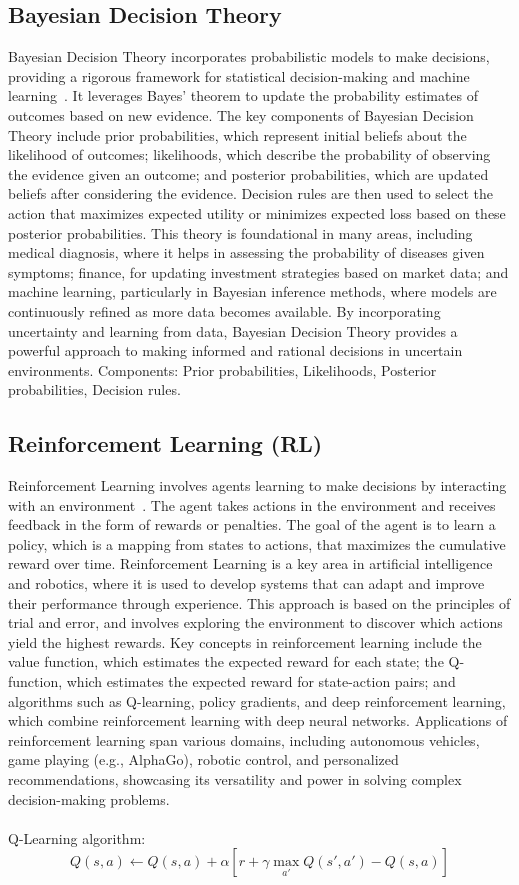 \documentclass[12pt]{article}
\begin{document}
\subsection{Bayesian Decision Theory}
Bayesian Decision Theory incorporates probabilistic models to make decisions, providing a rigorous
framework for statistical decision-making and machine learning~\cite{berger1985statistical}. It leverages Bayes'
theorem to update the probability estimates of outcomes based on new evidence.
The key components of Bayesian Decision Theory include prior probabilities, which
represent initial beliefs about the likelihood of outcomes; likelihoods, which describe
the probability of observing the evidence given an outcome; and posterior probabilities,
which are updated beliefs after considering the evidence. Decision rules are then used
to select the action that maximizes expected utility or minimizes expected loss based
on these posterior probabilities. This theory is foundational in many areas, including
medical diagnosis, where it helps in assessing the probability of diseases given
symptoms; finance, for updating investment strategies based on market data; and machine 
learning, particularly in Bayesian inference methods, where models are continuously
refined as more data becomes available. By incorporating uncertainty and learning from
data, Bayesian Decision Theory provides a powerful approach to making informed and
rational decisions in uncertain environments. Components: Prior probabilities, Likelihoods,
Posterior probabilities, Decision rules.

\subsection{Reinforcement Learning (RL)}
Reinforcement Learning involves agents learning to make decisions by interacting with an
environment~\cite{sutton2018reinforcement}. The agent takes actions in the environment and receives feedback in the
form of rewards or penalties. The goal of the agent is to learn a policy, which is a
mapping from states to actions, that maximizes the cumulative reward over time.
Reinforcement Learning is a key area in artificial intelligence and robotics, where it
is used to develop systems that can adapt and improve their performance through
experience. This approach is based on the principles of trial and error, and involves
exploring the environment to discover which actions yield the highest rewards.
Key concepts in reinforcement learning include the value function, which estimates
the expected reward for each state; the Q-function, which estimates the expected
reward for state-action pairs; and algorithms such as Q-learning, policy gradients,
and deep reinforcement learning, which combine reinforcement learning with deep neural
networks. Applications of reinforcement learning span various domains, including
autonomous vehicles, game playing (e.g., AlphaGo), robotic control, and personalized
recommendations, showcasing its versatility and power in solving complex decision-making
problems.\\
\\
Q-Learning algorithm:
\[ Q(s,a) \leftarrow Q(s,a) + \alpha [r + \gamma \max_{a'} Q(s',a') - Q(s,a)] \]
%
%
\end{document}
